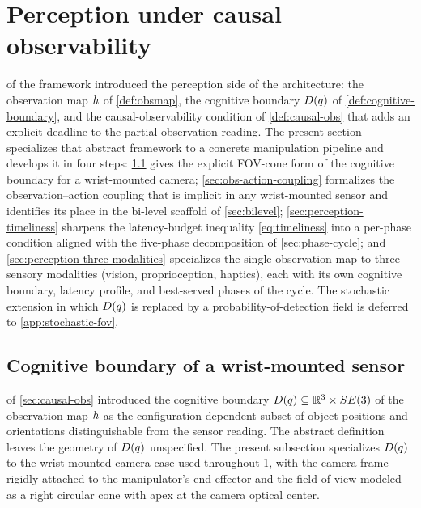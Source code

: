 \section{Perception under causal observability}
\label{sec:perception}

 of the framework introduced the perception
side of the architecture: the observation map $h$ of
\cref{def:obsmap}, the cognitive boundary $D(q)$ of
\cref{def:cognitive-boundary}, and the causal-observability
condition of \cref{def:causal-obs} that adds an explicit deadline
to the partial-observation reading. The present section specializes
that abstract framework to a concrete manipulation pipeline and
develops it in four steps: \cref{sec:perception-wrist-fov} gives
the explicit FOV-cone form of the cognitive boundary for a
wrist-mounted camera; \cref{sec:obs-action-coupling} formalizes the
observation--action coupling that is implicit in any wrist-mounted
sensor and identifies its place in the bi-level scaffold of
\cref{sec:bilevel}; \cref{sec:perception-timeliness} sharpens the
latency-budget inequality \eqref{eq:timeliness} into a per-phase
condition aligned with the five-phase decomposition of
\cref{sec:phase-cycle}; and \cref{sec:perception-three-modalities}
specializes the single observation map to three sensory modalities
(vision, proprioception, haptics), each with its own cognitive
boundary, latency profile, and best-served phases of the cycle. The
stochastic extension in which $D(q)$ is replaced by a
probability-of-detection field is deferred to
\cref{app:stochastic-fov}.

\subsection{Cognitive boundary of a wrist-mounted sensor}
\label{sec:perception-wrist-fov}

 of \cref{sec:causal-obs} introduced
the cognitive boundary $D(q) \subseteq \mathbb{R}^{3}
\times SE(3)$ of the observation map $h$ as the
configuration-dependent subset of object positions and
orientations distinguishable from the sensor reading. The
abstract definition leaves the geometry of $D(q)$
unspecified. The present subsection specializes
$D(q)$ to the wrist-mounted-camera case used throughout
\cref{sec:perception}, with the camera frame rigidly attached to
the manipulator's end-effector and the field of view modeled as a
right circular cone with apex at the camera optical center.

